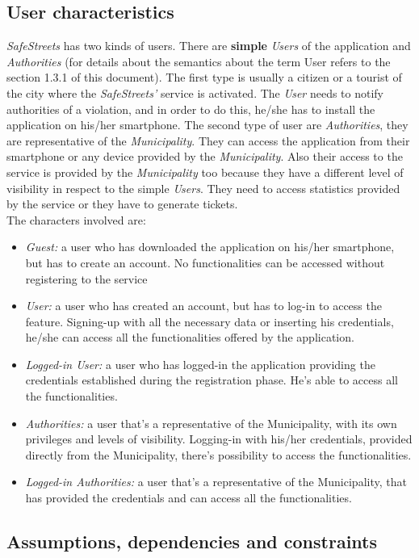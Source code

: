 \documentclass {article}
\begin{document}
	\subsection{User characteristics}
	{\it SafeStreets} has two kinds of users. There are  {\bf simple }{\it Users} of the application and {\it Authorities} (for details about the semantics about the term User refers to the section 1.3.1 of this document). The first type is usually a citizen or a tourist of the city where the {\it SafeStreets'} service is activated. The {\it User} needs to notify authorities of a violation,  and in order to do this, he/she has to install the application on his/her smartphone. The second type of user are {\it Authorities}, they are representative of the {\it Municipality}. They can access the application from their smartphone or any device provided by the {\it Municipality}. Also their access to the service is provided by the {\it Municipality} too because they have a different level of visibility in respect to the simple {\it Users}. They need to access statistics provided by the service or they have to generate tickets. \\
	The characters involved are:
	\begin{itemize}
		\item {\it Guest:} a user who has downloaded the application on his/her smartphone, but has to create an account. No functionalities can be accessed without registering to the service
		\item {\it User:} a user who has created an account, but has to log-in to access the feature. Signing-up with all the necessary data or inserting his credentials, he/she can access all the functionalities offered by the application.
		\item {\it Logged-in User:} a user who has logged-in the application providing the credentials established during the registration phase. He's able to access all the functionalities. 
		\item {\it Authorities:} a user that's a representative of the Municipality, with its own privileges and levels of visibility. Logging-in with his/her credentials, provided directly from the Municipality, there's possibility to access the functionalities.
		\item {\it Logged-in Authorities:} a user that's a representative of the Municipality, that has provided the credentials and can access all the functionalities.
	\end{itemize}
	
	\subsection{Assumptions, dependencies and constraints}
\end{document}
